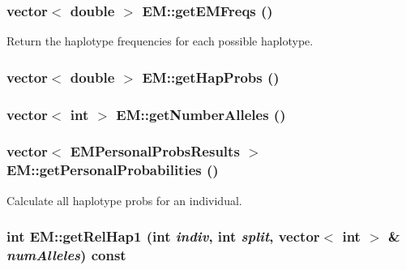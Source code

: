 \label{classEM_ac3787d2909eb87ac231b533482d1f644}
\hypertarget{classEM_ab5f91b9b53ea2090197c8e389ffa5a38}{
\subsubsection[{getEMFreqs}]{\setlength{\rightskip}{0pt plus 5cm}vector$<$ double $>$ EM::getEMFreqs ()}}
\label{classEM_ab5f91b9b53ea2090197c8e389ffa5a38}
Return the haplotype frequencies for each possible haplotype. \hypertarget{classEM_ac7552d323bf702bc7a76ade909415cab}{
\subsubsection[{getHapProbs}]{\setlength{\rightskip}{0pt plus 5cm}vector$<$ double $>$ EM::getHapProbs ()}}
\label{classEM_ac7552d323bf702bc7a76ade909415cab}
\hypertarget{classEM_a5050cd53ebe803ee4e677119af7869ae}{
\subsubsection[{getNumberAlleles}]{\setlength{\rightskip}{0pt plus 5cm}vector$<$ int $>$ EM::getNumberAlleles ()}}
\label{classEM_a5050cd53ebe803ee4e677119af7869ae}
\hypertarget{classEM_a07bb2d56390f494c885bd7c7ea4b53b9}{
\subsubsection[{getPersonalProbabilities}]{\setlength{\rightskip}{0pt plus 5cm}vector$<$ {\bf EMPersonalProbsResults} $>$ EM::getPersonalProbabilities ()}}
\label{classEM_a07bb2d56390f494c885bd7c7ea4b53b9}
Calculate all haplotype probs for an individual. \hypertarget{classEM_a456073e2e19b310df9ed0f953dbd6abc}{
\subsubsection[{getRelHap1}]{\setlength{\rightskip}{0pt plus 5cm}int EM::getRelHap1 (int {\em indiv}, \/  int {\em split}, \/  vector$<$ int $>$ \& {\em numAlleles}) const}}
\label{classEM_a456073e2e19b310df9ed0f953dbd6abc}


